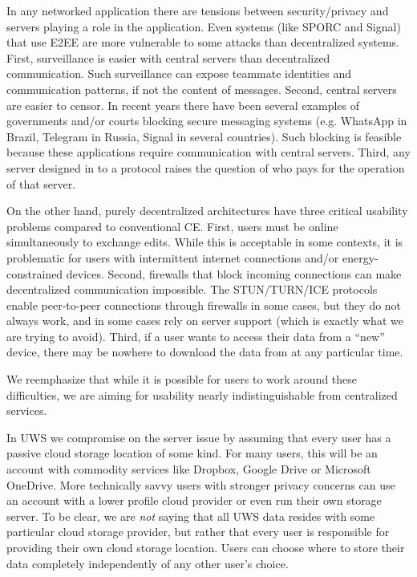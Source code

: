 \documentclass[runningheads]{llncs}
\begin{document}
In any networked application there are tensions between security{\slash}privacy and servers playing a role in the application.
Even systems (like SPORC and Signal) that use E2EE are more vulnerable to some attacks than decentralized systems.
First, surveillance is easier with central servers than decentralized communication.
Such surveillance can expose teammate identities and communication patterns, if not the content of messages.
Second, central servers are easier to censor.
In recent years there have been several examples of governments and{\slash}or courts blocking secure messaging systems (e.g. WhatsApp in Brazil, Telegram in Russia, Signal in several countries).
Such blocking is feasible because these applications require communication with central servers.
Third, any server designed in to a protocol raises the question of who pays for the operation of that server.

On the other hand, purely decentralized architectures have three critical usability problems compared to conventional CE.
First, users must be online simultaneously to exchange edits\footnotemark{}.
While this is acceptable in some contexts, it is problematic for users with intermittent internet connections and{\slash}or energy-constrained devices.
Second, firewalls that block incoming connections can make decentralized communication impossible.
The STUN{\slash}TURN{\slash}ICE protocols enable peer-to-peer connections through firewalls in some cases, but they do not always work, and in some cases rely on server support (which is exactly what we are trying to avoid).
Third, if a user wants to access their data from a ``new'' device, there may be nowhere to download the data from at any particular time.


We reemphasize that while it is possible for users to work around these difficulties, we are aiming for usability nearly indistinguishable from centralized services.

In UWS we compromise on the server issue by assuming that every user has a passive cloud storage location of some kind.
For many users, this will be an account with commodity services like Dropbox, Google Drive or Microsoft OneDrive.
More technically savvy users with stronger privacy concerns can use an account with a lower profile cloud provider or even run their own storage server.
To be clear, we are \emph{not} saying that all UWS data resides with some particular cloud storage provider, but rather that every user is responsible for providing their own cloud storage location.
Users can choose where to store their data completely independently of any other user's choice.
\end{document}
